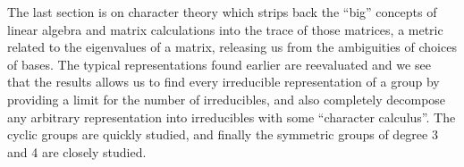 	The last section is on character theory which strips back the ``big'' concepts of linear algebra and matrix calculations into the trace of those matrices, a metric related to the eigenvalues of a matrix, releasing us from the ambiguities of choices of bases. The typical representations found earlier are reevaluated and we see that the results allows us to find every irreducible representation of a group by providing a limit for the number of irreducibles, and also completely decompose any arbitrary representation into irreducibles with some ``character calculus''. The cyclic groups are quickly studied, and finally the symmetric groups of degree 3 and 4 are closely studied.